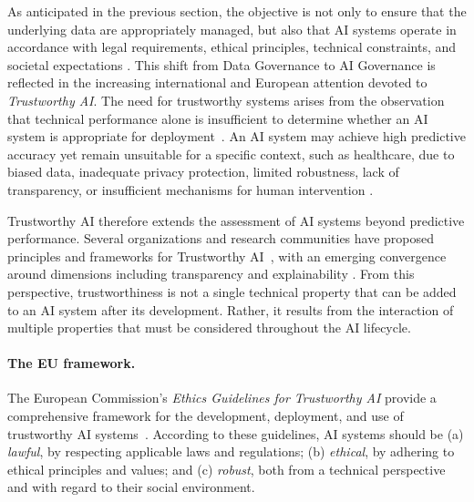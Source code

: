 As anticipated in the previous section, the objective is not only to ensure that the underlying data are appropriately managed, but also that AI systems operate in accordance with legal requirements, ethical principles, technical constraints, and societal expectations \cite{hamon_robustness_2020}. This shift from Data Governance to AI Governance is reflected in the increasing international and European attention devoted to \emph{Trustworthy AI}. The need for trustworthy systems arises from the observation that technical performance alone is insufficient to determine whether an AI system is appropriate for deployment~\cite{kaur_trustworthy_2022}. An AI system may achieve high predictive accuracy yet remain unsuitable for a specific context, such as healthcare, due to biased data, inadequate privacy protection, limited robustness, lack of transparency, or insufficient mechanisms for human intervention
\cite{kaur_trustworthy_2022, oecd_progress_2026, li_trustworthy_2023}.

Trustworthy AI therefore extends the assessment of AI systems beyond predictive performance. Several organizations and research communities have proposed principles and frameworks for Trustworthy AI~\cite{european_commission_ethics_nodate,lekadir_future-ai_2025, oecd_oecd_2019,unesco_recommendation_2022}, with an emerging convergence around dimensions including transparency and explainability \cite{kaur_trustworthy_2022}. From this perspective, trustworthiness is not a single technical property that can be added to an AI system after its development. Rather, it results from the interaction of multiple properties that must be considered throughout the AI lifecycle.

\paragraph{The EU framework.}
The European Commission's \emph{Ethics Guidelines for Trustworthy AI} provide a comprehensive framework for the development, deployment, and use of trustworthy AI systems~\cite{european_commission_ethics_nodate}. According to these guidelines, AI systems should be (a) \emph{lawful}, by respecting applicable laws and regulations; (b) \emph{ethical}, by adhering to ethical principles and values; and (c) \emph{robust}, both from a technical perspective and with regard to their social environment.

